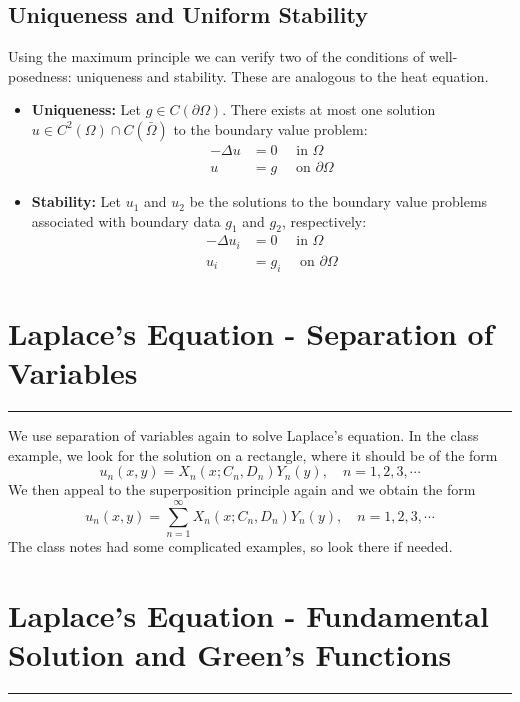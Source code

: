 \documentclass[11pt]{article}
\begin{document}
\subsection{Uniqueness and Uniform Stability}
Using the maximum principle we can verify two of the conditions of well-posedness: uniqueness and stability.  These are analogous to the heat equation. 
\begin{itemize}
\item \textbf{Uniqueness:}  Let $g \in C(\partial \Omega)$. There exists at most one solution $u \in C^2(\Omega) \cap C(\bar{\Omega})$ to the boundary value problem:
\begin{align*}
- \Delta u &= 0 \quad \text{ in } \Omega \\
u &=g \quad \text{ on } \partial \Omega 
\end{align*}
\item  \textbf{Stability:} Let $u_1$ and $u_2$ be the solutions to the boundary value problems associated with boundary data $g_1$ and $g_2$, respectively:
\begin{align*}
- \Delta u_i &= 0 \quad \text{ in } \Omega \\
u_i &=g_i \quad \text{ on } \partial \Omega 
\end{align*}
\end{itemize}

\pagebreak

\section{Laplace's Equation - Separation of Variables }
\hrule \vspace{15pt}

We use separation of variables again to solve Laplace's equation. In the class example, we look for the solution on a rectangle, where it should be of the form
$$ u_n(x,y) = X_n (x; C_n, D_n)Y_n(y), \quad n=1,2,3, \cdots $$
We then appeal to the superposition principle again and we obtain the form 
$$ u_n(x,y) = \sum_{n=1}^{\infty}  X_n (x; C_n, D_n)Y_n(y), \quad n=1,2,3, \cdots $$
The class notes had some complicated examples, so look there if needed.

\pagebreak

\section{Laplace's Equation - Fundamental Solution and Green's Functions}
\hrule \vspace{15pt}
\end{document}
